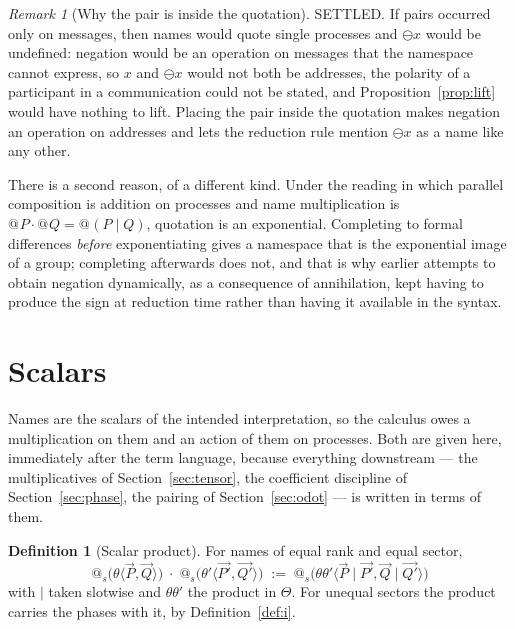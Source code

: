 \documentclass[11pt]{article}
\makeatletter
\theoremstyle{definition}
\newtheorem{definition}[theorem]{Definition}
\theoremstyle{remark}
\newtheorem{remark}[theorem]{Remark}
\newcommand{\quo}[1]{\ensuremath{@_{#1}}}
\newcommand{\dip}[2]{\ensuremath{\langle #1 , #2 \rangle}}
\newcommand{\negop}{\ensuremath{\ominus}}
\makeatother
\begin{document}
\begin{remark}[Why the pair is inside the quotation]
\label{rem:inside}
SETTLED. If pairs occurred only on messages, then names would quote single
processes and $\negop x$ would be undefined: negation would be an operation on
messages that the namespace cannot express, so $x$ and $\negop x$ would not both
be addresses, the polarity of a participant in a communication could not be
stated, and Proposition~\ref{prop:lift} would have nothing to lift. Placing the
pair inside the quotation makes negation an operation on addresses and lets the
reduction rule mention $\negop x$ as a name like any other.

There is a second reason, of a different kind. Under the reading in which
parallel composition is addition on processes and name multiplication is
$\quo{}P \cdot \quo{}Q = \quo{}(P\mid Q)$, quotation is an exponential.
Completing to formal differences \emph{before} exponentiating gives a namespace
that is the exponential image of a group; completing afterwards does not, and
that is why earlier attempts to obtain negation dynamically, as a consequence of
annihilation, kept having to produce the sign at reduction time rather than
having it available in the syntax.
\end{remark}

\section{Scalars}
\label{sec:scalars}

Names are the scalars of the intended interpretation, so the calculus owes a
multiplication on them and an action of them on processes. Both are given here,
immediately after the term language, because everything downstream --- the
multiplicatives of Section~\ref{sec:tensor}, the coefficient discipline of
Section~\ref{sec:phase}, the pairing of Section~\ref{sec:odot} --- is written in
terms of them.

\begin{definition}[Scalar product]
\label{def:nameprod}
For names of equal rank and equal sector,
\[
  \quo{s}\bigl(\theta\dip{\vec{P}}{\vec{Q}}\bigr)
  \;\cdot\;
  \quo{s}\bigl(\theta'\dip{\vec{P'}}{\vec{Q'}}\bigr)
  \;:=\;
  \quo{s}\bigl(\theta\theta'
    \dip{\vec{P} \mid \vec{P'}}{\vec{Q} \mid \vec{Q'}}\bigr)
\]
with $\mid$ taken slotwise and $\theta\theta'$ the product in $\Theta$. For
unequal sectors the product carries the phases with it, by
Definition~\ref{def:i}.
\end{definition}
\end{document}

